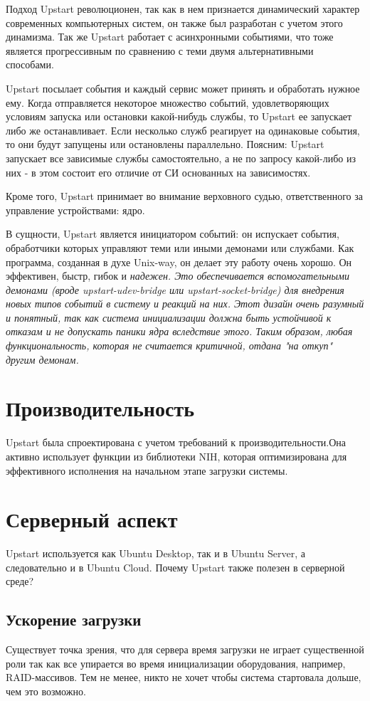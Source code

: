 Подход Upstart революционен, так как в нем признается динамический характер современных компьютерных систем, он также был разработан с учетом этого динамизма. Так же Upstart работает с асинхронными событиями, что тоже является прогрессивным по сравнению с теми двумя альтернативными способами.

Upstart посылает события и каждый сервис может принять и обработать нужное ему. Когда отправляется некоторое множество событий, удовлетворяющих условиям запуска или остановки какой-нибудь службы, то Upstart ее запускает либо же останавливает. Если несколько служб реагирует на одинаковые события, то они будут запущены или остановлены параллельно. Поясним: Upstart запускает все зависимые службы самостоятельно, а не по запросу какой-либо из них - в этом состоит его отличие от СИ основанных на зависимостях.

Кроме того, Upstart принимает во внимание верховного судью, ответственного за управление устройствами: ядро.

В сущности, Upstart является инициатором событий: он испускает события, обработчики которых управляют теми или иными демонами или службами. Как программа, созданная в духе Unix-way, он делает эту работу очень хорошо. Он эффективен, быстр, гибок и \it{надежен}. Это обеспечивается вспомогательными демонами (вроде upstart-udev-bridge или upstart-socket-bridge) для внедрения новых типов событий в систему и реакций на них. Этот дизайн очень разумный и понятный, так как система инициализации должна быть устойчивой к отказам и не допускать паники ядра вследствие этого. Таким образом, любая функциональность, которая не считается критичной, отдана "на откуп" другим демонам.
\section{Производительность}
Upstart была спроектирована с учетом требований к производительности.Она активно использует функции из библиотеки NIH, которая оптимизирована для эффективного исполнения на начальном этапе загрузки системы. 
\section{Серверный аспект} 
Upstart используется как Ubuntu Desktop, так и в Ubuntu Server, а следовательно и в Ubuntu Cloud. Почему Upstart также полезен в серверной среде?
\subsection{Ускорение загрузки}
Существует точка зрения, что для сервера время загрузки не играет существенной роли так как все упирается во время инициализации оборудования, например, RAID-массивов. Тем не менее, никто не хочет чтобы система стартовала дольше, чем это возможно.

